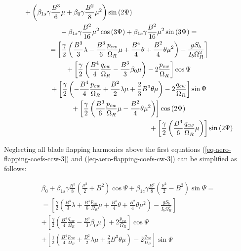 \begin{gather}
\begin{multlined}[0.88\textwidth]
    +
    \left(
        \beta_{1s} \gamma \frac{B^3}{6} \mu
      + \beta_0 \gamma \frac{B^2}{8} \mu^2
    \right) \sin \left( 2 \Psi \right)
    \\
    -
    \beta_{1s} \gamma \frac{B^2}{16} \mu^2 \cos \left( 3 \Psi \right)
    +
    \beta_{1c} \gamma \frac{B^2}{16} \mu^2 \sin \left( 3 \Psi \right)
    = \\ =
    \left[
      \frac{\gamma}{2}
      \left(
          \frac{B^3}{3} \lambda
        - \frac{B^3}{6} \frac{p_{cw}}{\Omega_R} \mu
        + \frac{B^4}{4} \theta
        + \frac{B^2}{4} \theta \mu^2
      \right) - \frac{ g S_b }{ I_b \Omega_R^2 }
    \right]
    \\
    + \left[
      \frac{\gamma}{2}
      \left(
          \frac{B^4}{4} \frac{q_{cw}}{\Omega_R}
        - \frac{B^3}{3} \beta_0 \mu
      \right) - 2 \frac{p_{cw}}{\Omega_R}
    \right] \cos \Psi
    \\
    + \left[
      \frac{\gamma}{2}
      \left(
        - \frac{B^4}{4} \frac{p_{cw}}{\Omega_R}
        + \frac{B^2}{2} \lambda \mu
        + \frac{2}{3} B^3 \theta \mu
        \right) - 2 \frac{q_{cw}}{\Omega_R}
    \right] \sin \Psi
    \\
    + \left[
      \frac{\gamma}{2}
      \left(
          \frac{B^3}{6} \frac{p_{cw}}{\Omega_R} \mu
        - \frac{B^2}{4} \theta \mu^2
      \right)
    \right] \cos \left( 2 \Psi \right)
    \\
    + \left[
      \frac{\gamma}{2}
      \left( \frac{B^3}{6} \frac{q_{cw}}{\Omega_R} \mu \right)
    \right] \sin \left( 2 \Psi \right)
  \end{multlined}
\end{gather}

Neglecting all blade flapping harmonics above the first \cite{GessowMyers1985} equations (\ref{eq-aero-flapping-coefs-ccw-3}) and (\ref{eq-aero-flapping-coefs-cw-3}) can be simplified as follows:

\begin{multline}
  \label{eq-aero-flapping-coefs-ccw-4}
  \beta_0
  +
  \beta_{1s} \gamma \frac{B^2}{8}
  \left( \frac{\mu^2}{2} + B^2 \right) \cos \Psi
  +
  \beta_{1c} \gamma \frac{B^2}{8}
  \left( \frac{\mu^2}{2} - B^2 \right) \sin \Psi
  = \\ =
  \left[
    \frac{\gamma}{2}
    \left(
        \frac{B^3}{3} \lambda
      + \frac{B^3}{6} \frac{p_{cw}}{\Omega_R} \mu
      + \frac{B^4}{4} \theta
      + \frac{B^2}{4} \theta \mu^2
    \right) - \frac{ g S_b }{ I_b \Omega_R^2 }
  \right]
  \\
  + \left[
    \frac{\gamma}{2}
    \left(
      \frac{B^4}{4} \frac{q_{cw}}{\Omega_R}
      - \frac{B^3}{3} \beta_0 \mu
    \right) + 2 \frac{p_{cw}}{\Omega_R}
  \right] \cos \Psi
  \\
  + \left[
    \frac{\gamma}{2}
    \left(
        \frac{B^4}{4} \frac{p_{cw}}{\Omega_R}
      + \frac{B^2}{2} \lambda \mu
      + \frac{2}{3} B^3 \theta \mu
    \right) - 2 \frac{q_{cw}}{\Omega_R}
  \right] \sin \Psi
\end{multline}

